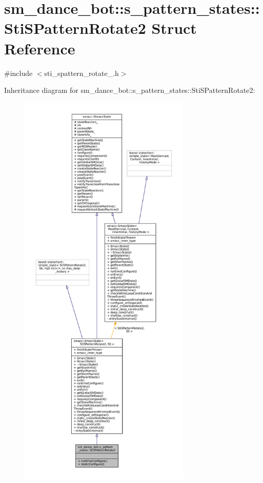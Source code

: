 \hypertarget{structsm__dance__bot_1_1s__pattern__states_1_1StiSPatternRotate2}{}\section{sm\+\_\+dance\+\_\+bot\+:\+:s\+\_\+pattern\+\_\+states\+:\+:Sti\+S\+Pattern\+Rotate2 Struct Reference}
\label{structsm__dance__bot_1_1s__pattern__states_1_1StiSPatternRotate2}


{\ttfamily \#include $<$sti\+\_\+spattern\+\_\+rotate\+\_.\+h$>$}



Inheritance diagram for sm\+\_\+dance\+\_\+bot\+:\+:s\+\_\+pattern\+\_\+states\+:\+:Sti\+S\+Pattern\+Rotate2\+:
\nopagebreak
\begin{figure}[H]
\begin{center}
\leavevmode
\includegraphics[height=550pt]{structsm__dance__bot_1_1s__pattern__states_1_1StiSPatternRotate2__inherit__graph}
\end{center}
\end{figure}


